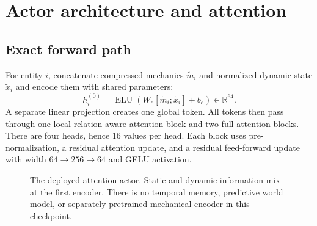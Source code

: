 \documentclass[11pt,letterpaper]{article}
\newcommand{\R}{\mathbb{R}}
\begin{document}
\section{Actor architecture and attention}
\label{sec:actor}

\subsection{Exact forward path}
For entity $i$, concatenate compressed mechanics $\widetilde m_i$ and normalized
dynamic state $\widetilde x_i$ and encode them with shared parameters:
\begin{equation}
 h_i^{(0)}=\operatorname{ELU}\!\left(W_e
 [\widetilde m_i;\widetilde x_i]+b_e\right)\in\R^{64}.
 \label{eq:encoder}
\end{equation}
A separate linear projection creates one global token. All tokens then pass
through one local relation-aware attention block and two full-attention blocks.
There are four heads, hence 16 values per head. Each block uses pre-normalization,
a residual attention update, and a residual feed-forward update with width
$64\rightarrow256\rightarrow64$ and GELU activation.

\begin{figure}[htbp]
\centering
{}
\caption{The deployed attention actor. Static and dynamic information mix at the
first encoder. There is no temporal memory, predictive world model, or separately
pretrained mechanical encoder in this checkpoint.}
\label{fig:architecture}
\end{figure}
\end{document}
